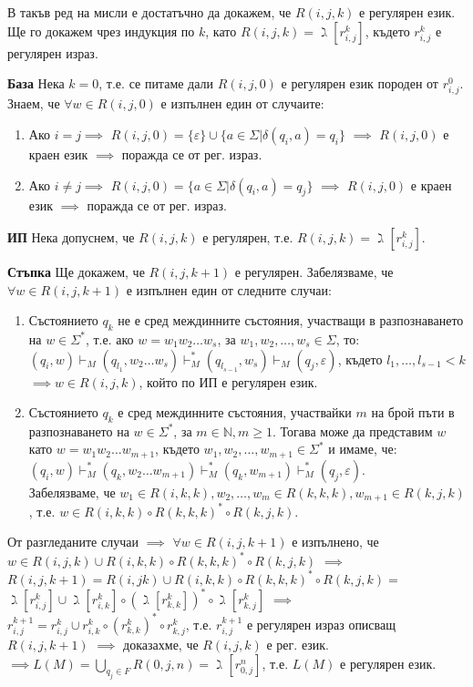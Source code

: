 \documentclass[fleqn,12pt]{article}
\begin{document}
\begin{flushleft}
В такъв ред на мисли е достатъчно да докажем, че $R(i, j, k)$ е регулярен език. Ще го докажем чрез индукция по $k$, като $R(i, j, k) = \gimel[r_{i, j}^k]$, където $r_{i, j}^k$ е регулярен израз.

\textbf{База} Нека $k = 0$, т.е. се питаме дали $R(i, j, 0)$ е регулярен език породен от $r_{i, j}^0$. Знаем, че $\forall w \in R(i, j, 0)$ е изпълнен един от случаите:
\begin{enumerate}
    \item Ако $i = j \implies$ $R(i, j, 0) = \{\varepsilon\} \cup \{a \in \Sigma | \delta(q_i, a) = q_i\}$ $\implies$ $R(i, j, 0)$ е краен език $\implies$ поражда се от рег. израз.
    \item Ако $i \neq j \implies$ $R(i, j, 0) = \{a \in \Sigma | \delta(q_i, a) = q_j\}$ $\implies$ $R(i, j, 0)$ е краен език $\implies$ поражда се от рег. израз.
\end{enumerate}

\textbf{ИП} Нека допуснем, че $R(i, j, k)$ е регулярен, т.е. $R(i, j, k) = \gimel[r_{i, j}^k]$.

\textbf{Стъпка} Ще докажем, че $R(i, j, k+1)$ е регулярен. Забелязваме, че $\forall w \in R(i, j, k+1)$ е изпълнен един от следните случаи:
\begin{enumerate}
    \item Състоянието $q_k$ не е сред междинните състояния, участващи в разпознаването на $w \in \Sigma^*$, т.е. ако $w = w_1w_2{\dots}w_s$, за $w_1, w_2, \dots, w_s \in \Sigma$, то: \\
    $(q_i, w) \vdash_M (q_{l_1}, w_2{\dots}w_s) \vdash_M^* (q_{l_{s-1}}, w_s) \vdash_M (q_j, \varepsilon)$, където ${l_1}, \dots, {l_{s-1}} < k$ $\implies w \in R(i, j, k)$, който по ИП е регулярен език.
    \item Състоянието $q_k$ е сред междинните състояния, участвайки $m$ на брой пъти в разпознаването на $w \in \Sigma^*$, за $m \in \mathbb{N}, m \geq 1$. Тогава може да представим $w$ като $w = w_1w_2{\dots}w_{m+1}$, където $w_1, w_2, \dots, w_{m+1} \in \Sigma^*$ и имаме, че: \\
    $(q_i, w) \vdash_M^* (q_k, w_2{\dots}w_{m+1}) \vdash_M^* (q_k, w_{m+1}) \vdash_M^* (q_j, \varepsilon)$. \\
    Забелязваме, че $w_1 \in R(i, k, k), w_2, \dots, w_m \in R(k, k, k), w_{m+1} \in R(k, j, k)$, т.е. $w \in R(i, k, k) \circ R(k, k, k)^* \circ R(k, j, k)$.
\end{enumerate}

От разгледаните случаи $\implies$ $\forall w \in R(i, j, k+1)$ е изпълнено, че $w \in R(i, j, k) \cup R(i, k, k) \circ R(k, k, k)^* \circ R(k, j, k)$ $\implies$ $R(i, j, k+1) = R(i, j k) \cup R(i, k, k) \circ R(k, k, k)^* \circ R(k, j, k) =$$\gimel[r_{i, j}^k] \cup \gimel[r_{i, k}^k] \circ (\gimel[r_{k, k}^k])^* \circ \gimel[r_{k, j}^k]$ $\implies$ $r_{i, j}^{k+1} = r_{i, j}^k \cup r_{i, k}^{k} \circ (r_{k, k}^{k})^* \circ r_{k, j}^{k}$, т.е. $r_{i, j}^{k+1}$ е регулярен израз описващ $R(i, j, k+1)$ $\implies$ доказахме, че $R(i, j, k)$ е рег. език. \\
$\implies L(M) = \bigcup\limits_{q_j \in F} R(0, j, n) = \gimel[r_{0, j}^n]$, т.е. $L(M)$ е регулярен език. \square


\end{flushleft}
\end{document}
